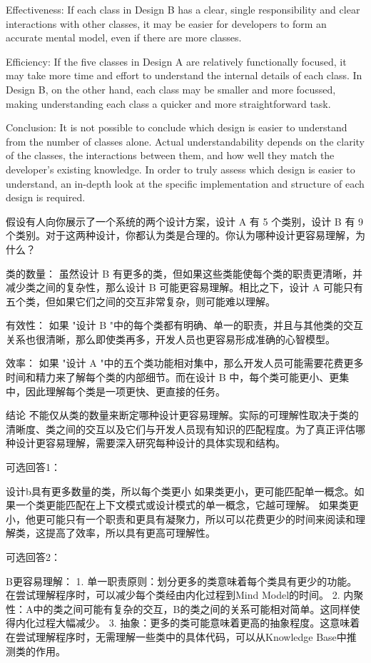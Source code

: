 \documentclass[]{ctexbook}
\begin{document}
Effectiveness: If each class in Design B has a clear, single responsibility and clear interactions with other classes, it may be easier for developers to form an accurate mental model, even if there are more classes.

Efficiency: If the five classes in Design A are relatively functionally focused, it may take more time and effort to understand the internal details of each class. In Design B, on the other hand, each class may be smaller and more focussed, making understanding each class a quicker and more straightforward task.

Conclusion: It is not possible to conclude which design is easier to understand from the number of classes alone. Actual understandability depends on the clarity of the classes, the interactions between them, and how well they match the developer's existing knowledge. In order to truly assess which design is easier to understand, an in-depth look at the specific implementation and structure of each design is required.

假设有人向你展示了一个系统的两个设计方案，设计 A 有 5 个类别，设计 B 有 9 个类别。对于这两种设计，你都认为类是合理的。你认为哪种设计更容易理解，为什么？

类的数量： 虽然设计 B 有更多的类，但如果这些类能使每个类的职责更清晰，并减少类之间的复杂性，那么设计 B 可能更容易理解。相比之下，设计 A 可能只有五个类，但如果它们之间的交互非常复杂，则可能难以理解。

有效性： 如果 "设计 B "中的每个类都有明确、单一的职责，并且与其他类的交互关系也很清晰，那么即使类再多，开发人员也更容易形成准确的心智模型。

效率： 如果 "设计 A "中的五个类功能相对集中，那么开发人员可能需要花费更多时间和精力来了解每个类的内部细节。而在设计 B 中，每个类可能更小、更集中，因此理解每个类是一项更快、更直接的任务。

结论 不能仅从类的数量来断定哪种设计更容易理解。实际的可理解性取决于类的清晰度、类之间的交互以及它们与开发人员现有知识的匹配程度。为了真正评估哪种设计更容易理解，需要深入研究每种设计的具体实现和结构。

可选回答1：

设计b具有更多数量的类，所以每个类更小
如果类更小，更可能匹配单一概念。如果一个类更能匹配在上下文模式或设计模式的单一概念，它越可理解。
如果类更小，他更可能只有一个职责和更具有凝聚力，所以可以花费更少的时间来阅读和理解类，这提高了效率，所以具有更高可理解性。

可选回答2：

B更容易理解：
1. 单一职责原则：划分更多的类意味着每个类具有更少的功能。在尝试理解程序时，可以减少每个类经由内化过程到Mind Model的时间。
2. 内聚性：A中的类之间可能有复杂的交互，B的类之间的关系可能相对简单。这同样使得内化过程大幅减少。
3. 抽象：更多的类可能意味着更高的抽象程度。这意味着在尝试理解程序时，无需理解一些类中的具体代码，可以从Knowledge Base中推测类的作用。
\end{document}
